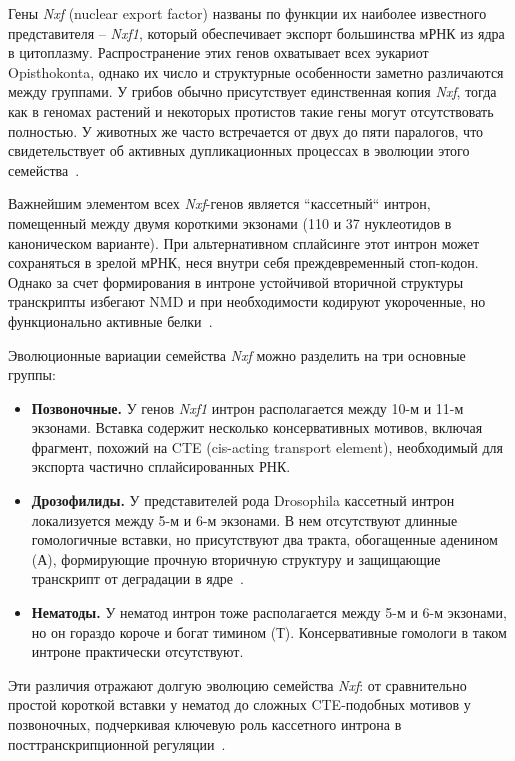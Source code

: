 Гены \textit{Nxf} (nuclear export factor) названы по функции их наиболее известного представителя – \textit{Nxf1}, который обеспечивает экспорт большинства мРНК из ядра в цитоплазму.
Распространение этих генов охватывает всех эукариот Opisthokonta, однако их число и структурные особенности заметно различаются между группами.
У грибов обычно присутствует единственная копия \textit{Nxf}, тогда как в геномах растений и некоторых протистов такие гены могут отсутствовать полностью.
У животных же часто встречается от двух до пяти паралогов, что свидетельствует об активных дупликационных процессах в эволюции этого семейства~\cite{Mamon2013}.

Важнейшим элементом всех \textit{Nxf}-генов является ``кассетный`` интрон, помещенный между двумя короткими экзонами (110 и 37 нуклеотидов в каноническом варианте).
При альтернативном сплайсинге этот интрон может сохраняться в зрелой мРНК, неся внутри себя преждевременный стоп-кодон.
Однако за счет формирования в интроне устойчивой вторичной структуры транскрипты избегают NMD и при необходимости кодируют укороченные, но функционально активные белки~\cite{Mamon2013,Golubkova2012}.

Эволюционные вариации семейства \textit{Nxf} можно разделить на три основные группы:

\begin{spacing}{0.5}
\begin{itemize}
  \item \textbf{Позвоночные.} У генов \textit{Nxf1} интрон располагается между 10-м и 11-м экзонами. Вставка содержит несколько консервативных мотивов, включая фрагмент, похожий на CTE (cis-acting transport element), необходимый для экспорта частично сплайсированных РНК.
  \item \textbf{Дрозофилиды.} У представителей рода Drosophila кассетный интрон локализуется между 5-м и 6-м экзонами. В нем отсутствуют длинные гомологичные вставки, но присутствуют два тракта, обогащенные аденином (А), формирующие прочную вторичную структуру и защищающие транскрипт от деградации в ядре~\cite{Mamon2013,Roy2006}.
  \item \textbf{Нематоды.} У нематод интрон тоже располагается между 5-м и 6-м экзонами, но он гораздо короче и богат тимином (Т). Консервативные гомологи в таком интроне практически отсутствуют.
\end{itemize}
\end{spacing}

Эти различия отражают долгую эволюцию семейства \textit{Nxf}: от сравнительно простой короткой вставки у нематод до сложных CTE-подобных мотивов у позвоночных, подчеркивая ключевую роль кассетного интрона в посттранскрипционной регуляции~\cite{Mamon2013,Golubkova2012}.


